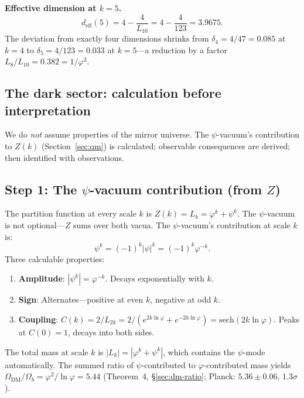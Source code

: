 \documentclass[12pt,a4paper]{article}
\begin{document}
\textbf{Effective dimension at $k = 5$.}
\begin{equation}
d_{\mathrm{eff}}(5) = 4 - \frac{4}{L_{10}} = 4 - \frac{4}{123} = 3.9675.
\end{equation}
The deviation from exactly four dimensions shrinks from $\delta_4 = 4/47 = 0.085$ at $k = 4$ to $\delta_5 = 4/123 = 0.033$ at $k = 5$---a reduction by a factor $L_8/L_{10} = 0.382 = 1/\varphi^2$.


\subsection{The dark sector: calculation before interpretation}
\label{sec:dark-sector}


We do \emph{not} assume properties of the mirror universe. The $\psi$-vacuum's contribution to $Z(k)$ (Section~\ref{sec:qm}) is calculated; observable consequences are derived; then identified with observations.

\subsection{Step 1: The $\psi$-vacuum contribution (from $Z$)}

The partition function at every scale $k$ is $Z(k) = L_k = \varphi^k + \psi^k$. The $\psi$-vacuum is not optional---$Z$ sums over both vacua. The $\psi$-vacuum's contribution at scale $k$ is:
\begin{equation}
\psi^k = (-1)^k |\psi|^k = (-1)^k \varphi^{-k}.
\end{equation}
Three calculable properties:

\begin{enumerate}
\item \textbf{Amplitude}: $|\psi^k| = \varphi^{-k}$. Decays exponentially with $k$.
\item \textbf{Sign}: Alternates---positive at even $k$, negative at odd $k$.
\item \textbf{Coupling}: $C(k) = 2/L_{2k} = 2/(e^{2k\ln\varphi} + e^{-2k\ln\varphi}) = \mathrm{sech}(2k\ln\varphi)$. Peaks at $C(0) = 1$, decays into both sides.
\end{enumerate}

\noindent The total mass at scale $k$ is $|L_k| = |\varphi^k + \psi^k|$, which contains the $\psi$-mode automatically.  The summed ratio of $\psi$-contributed to $\varphi$-contributed mass yields $\Omega_{\mathrm{DM}}/\Omega_b = \varphi^2/\ln\varphi = 5.44$ (Theorem~4, \S\ref{sec:dm-ratio}; Planck: $5.36 \pm 0.06$, $1.3\sigma$).
\end{document}
